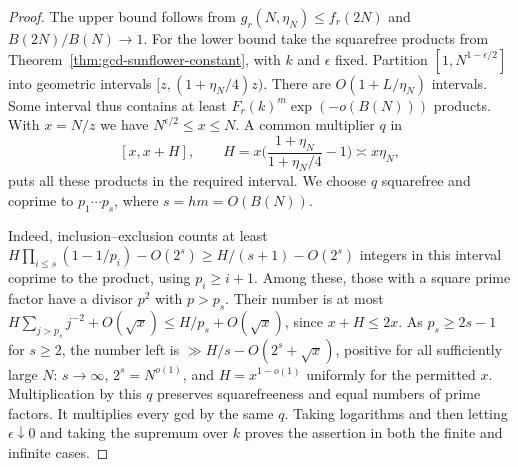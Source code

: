 \documentclass[11pt,a4paper]{article}
\begin{document}
\begin{proof}
The upper bound follows from $g_r(N,\eta_N)\le f_r(2N)$ and
$B(2N)/B(N)\to1$. For the lower bound take the squarefree products from
Theorem~\ref{thm:gcd-sunflower-constant}, with $k$ and $\epsilon$ fixed. Partition
$[1,N^{1-\epsilon/2}]$ into geometric intervals $[z,(1+\eta_N/4)z)$.
There are $O(1+L/\eta_N)$ intervals. Some interval thus contains at
least $F_r(k)^m\exp(-o(B(N)))$ products. With $x=N/z$ we have
$N^{\epsilon/2}\le x\le N$. A common multiplier $q$ in
\[
 [x,x+H],\qquad H=x\biggl(\frac{1+\eta_N}{1+\eta_N/4}-1\biggr)
 \asymp x\eta_N,
\]
puts all these products in the required interval. We choose $q$ squarefree
and coprime to $p_1\cdots p_s$, where $s=hm=O(B(N))$.

Indeed, inclusion--exclusion counts at least
$H\prod_{i\le s}(1-1/p_i)-O(2^s)\ge H/(s+1)-O(2^s)$ integers in this
interval coprime to the product, using $p_i\ge i+1$. Among these, those
with a square prime factor have a divisor $p^2$ with $p>p_s$. Their
number is at most
$H\sum_{j>p_s}j^{-2}+O(\sqrt{x})\le H/p_s+O(\sqrt{x})$, since
$x+H\le2x$. As $p_s\ge2s-1$ for $s\ge2$, the number left is
$\gg H/s-O(2^s+\sqrt{x})$, positive for all sufficiently large $N$:
$s\to\infty$, $2^s=N^{o(1)}$, and $H=x^{1-o(1)}$ uniformly for the
permitted $x$. Multiplication by this $q$ preserves squarefreeness and
equal numbers of prime factors. It multiplies every gcd by the same $q$.
Taking logarithms and then letting $\epsilon\downarrow0$ and taking the
supremum over $k$ proves the assertion in both the finite and infinite cases.
\end{proof}
\endgroup
\end{document}
